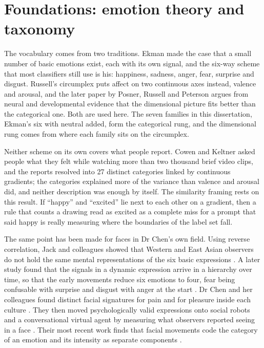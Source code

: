 \section{Foundations: emotion theory and taxonomy}
\label{sec:lit-theory}

The vocabulary comes from two traditions. Ekman \cite{ekman1992argument} made the case that a small number of basic emotions exist, each with its own signal, and the six-way scheme that most classifiers still use is his: happiness, sadness, anger, fear, surprise and disgust. Russell's circumplex \cite{russell1980circumplex} puts affect on two continuous axes instead, valence and arousal, and the later paper by Posner, Russell and Peterson \cite{posner2005circumplex} argues from neural and developmental evidence that the dimensional picture fits better than the categorical one. Both are used here. The seven families in this dissertation, Ekman's six with neutral added, form the categorical rung, and the dimensional rung comes from where each family sits on the circumplex.

Neither scheme on its own covers what people report. Cowen and Keltner \cite{cowen2017self} asked people what they felt while watching more than two thousand brief video clips, and the reports resolved into 27 distinct categories linked by continuous gradients; the categories explained more of the variance than valence and arousal did, and neither description was enough by itself. The similarity framing rests on this result. If ``happy'' and ``excited'' lie next to each other on a gradient, then a rule that counts a drawing read as excited as a complete miss for a prompt that said happy is really measuring where the boundaries of the label set fall.

The same point has been made for faces in Dr Chen's own field. Using reverse correlation, Jack and colleagues showed that Western and East Asian observers do not hold the same mental representations of the six basic expressions \cite{jack2012facial}. A later study found that the signals in a dynamic expression arrive in a hierarchy over time, so that the early movements reduce six emotions to four, fear being confusable with surprise and disgust with anger at the start \cite{jack2014dynamic}. Dr Chen and her colleagues found distinct facial signatures for pain and for pleasure inside each culture \cite{chen2018distinct}. They then moved psychologically valid expressions onto social robots and a conversational virtual agent by measuring what observers reported seeing in a face \cite{chen2018reverse, chen2020building}. Their most recent work finds that facial movements code the category of an emotion and its intensity as separate components \cite{chen2024cultural}.

